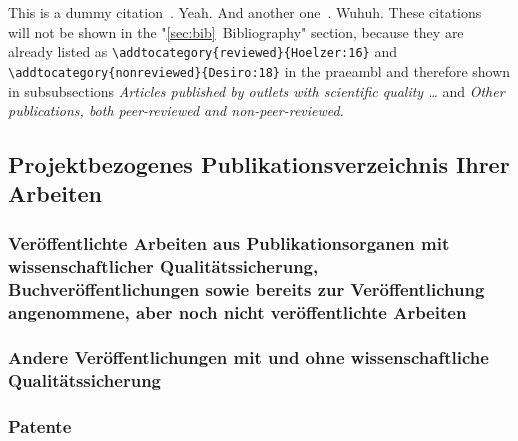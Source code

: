 \documentclass{scrartcl}
\begin{document}
This is a dummy citation~\cite{Hoelzer:17}. Yeah. And another
one~\cite{Gerst:18}. Wuhuh. These citations~\cite{Hoelzer:16, Desiro:18} will
not be shown in the "\ref{sec:bib}~Bibliography" section, because they are
already listed as \verb=\addtocategory{reviewed}{Hoelzer:16}= and
\verb=\addtocategory{nonreviewed}{Desiro:18}= in the praeambl and therefore
shown in subsubsections \emph{Articles published by outlets with scientific
quality \dots} and \emph{Other publications, both peer-reviewed and non-peer-reviewed}. 

\lipsum[1]


\subsection{Projektbezogenes Publikationsverzeichnis Ihrer Arbeiten}

\subsubsection{Veröffentlichte Arbeiten aus Publikationsorganen mit
  wissenschaftlicher Qualitätssicherung, Buchveröffentlichungen sowie
  bereits zur Veröffentlichung angenommene, aber noch nicht
  veröffentlichte Arbeiten}

\newrefcontext[labelprefix=E]
\printbibliography[category=reviewed, heading=none, env=bibliographyNUM, resetnumbers]

\subsubsection{Andere Veröffentlichungen mit und ohne wissenschaftliche Qualitätssicherung}
\printbibliography[category=nonreviewed, heading=none, env=bibliographyNUM, resetnumbers=false]

\subsubsection{Patente}
\end{document}
